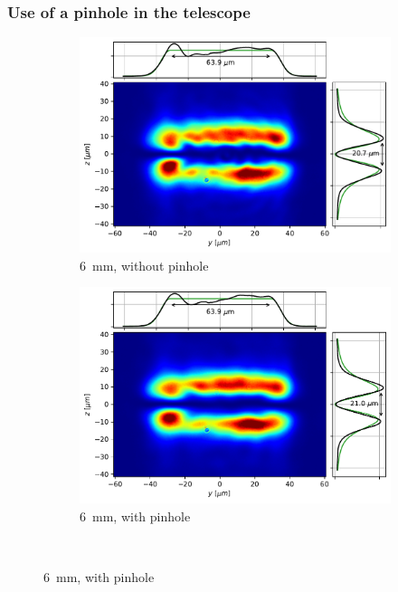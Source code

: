 \subsubsection{Use of a pinhole in the telescope}

\begin{figure}
    \centering
    \begin{subfigure}{0.45\textwidth}
        \includegraphics[width=\textwidth]{chapters/chapter_3/figures/large_nopin.pdf}
        \caption{\SI{6}{mm}, without pinhole}
    \end{subfigure}
    \hfill
    \begin{subfigure}{0.45\textwidth}
        \includegraphics[width=\textwidth]{chapters/chapter_3/figures/large_pin.pdf}
        \caption{\SI{6}{mm}, with pinhole}
    \end{subfigure}\\

\end{figure}
